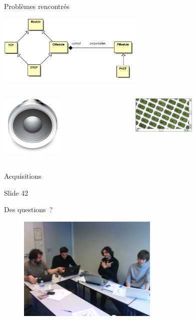 \documentclass[frenchb]{beamer}
\begin{document}
\begin{frame}{Problèmes rencontrés}
    \begin{center}
        \includegraphics[width=7cm]{../img/ps/pacmodule-psm.pdf}
    \end{center}
    \pause
    \begin{columns}
        \begin{column}[l]{7cm}
        \includegraphics[width=3cm]{../img/png/arts128x128.png}
        \end{column}
        \pause
        \begin{column}[r]{4cm}
        \includegraphics[width=3cm]{../img/png/graphicsview-view.png}
        \end{column}
    \end{columns}
\end{frame}

\begin{frame}{Acquisitions}
\end{frame}

\begin{frame}{Slide 42}
    \begin{center}
        \Huge Des questions~?
        \begin{figure}
            \includegraphics[height=5cm]{../img/jpg/workingteam.jpg}
        \end{figure}
    \end{center}
\end{frame}
\end{document}
